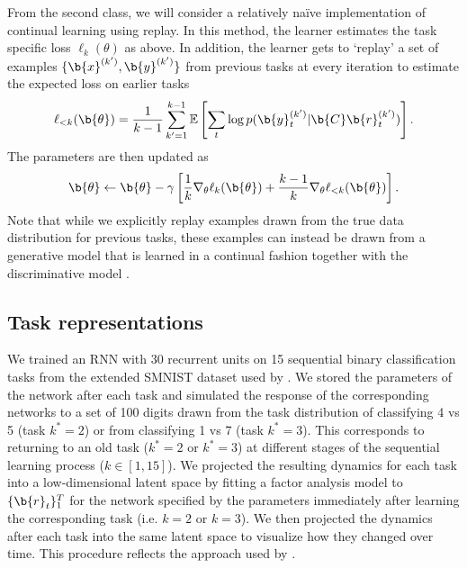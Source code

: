 From the second class, we will consider a relatively naïve implementation of continual learning using replay.
In this method, the learner estimates the task specific loss $\ell_k(\theta)$ as above.
In addition, the learner gets to `replay' a set of examples $\{ \b{x}^{(k')}, \b{y}^{(k')} \}$ from previous tasks at every iteration to estimate the expected loss on earlier tasks
\begin{equation}
    \label{eq:replay}
    \ell_{<k}(\b{\theta}) = \frac{1}{k-1} \sum_{k' = 1}^{k-1} \mathbb{E} \left [ \sum_t \log p(\b{y}^{(k')}_t | \b{C} \b{r}^{(k')}_t) \right ].
\end{equation}
The parameters are then updated as
\begin{equation}
    \b{\theta} \leftarrow \b{\theta} - \gamma \left [ \frac{1}{k} \nabla_\theta \ell_k(\b{\theta}) + \frac{k-1}{k} \nabla_\theta \ell_{<k}(\b{\theta}) \right].
\end{equation}
Note that while we explicitly replay examples drawn from the true data distribution for previous tasks, these examples can instead be drawn from a generative model that is learned in a continual fashion together with the discriminative model \citep{van2018generative, van2020brain}.

\subsection*{Task representations}

%

We trained an RNN with 30 recurrent units on 15 sequential binary classification tasks from the extended SMNIST dataset used by \citet{kao2021natural}.
We stored the parameters of the network after each task and simulated the response of the corresponding networks to a set of 100 digits drawn from the task distribution of classifying 4 vs 5 (task $k^*=2$) or from classifying 1 vs 7 (task $k^*=3$).
This corresponds to returning to an old task ($k^*=2$ or $k^*=3$) at different stages of the sequential learning process ($k \in [1, 15]$).
We projected the resulting dynamics for each task into a low-dimensional latent space by fitting a factor analysis model to $\{ \b{r}_t \}_1^T$ for the network specified by the parameters immediately after learning the corresponding task (i.e. $k=2$ or $k=3$).
We then projected the dynamics after each task into the same latent space to visualize how they changed over time.
This procedure reflects the approach used by \citet{kao2021natural}.

